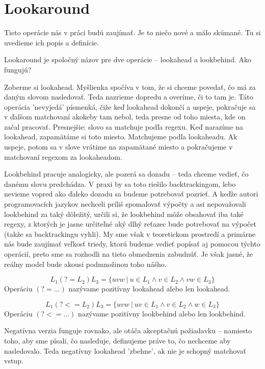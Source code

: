 \section{Lookaround}
\label{dflookaround}

Tieto operácie nás v práci budú zaujímať. Je to niečo nové a málo skúmané. Tu si uvedieme ich popis a definície.

Lookaround je spoločný názov pre dve operácie -- lookahead a lookbehind. Ako fungujú? 

Zoberme si lookahead. Myšlienka spočíva v tom, že si chceme povedať, čo má za daným slovom nasledovať. Teda nazrieme dopredu a overíme, či to tam je. Táto operácia 'nevyjedá' písmenká, čiže keď lookahead dokončí a uspeje, pokračuje sa v ďalšom matchovaní akokeby tam nebol, teda presne od toho miesta, kde on začal pracovať. Presnejšie: slovo sa matchuje podľa regexu. Keď narazíme na lookahead, zapamätáme si toto miesto. Matchujeme podľa lookaheadu. Ak uspeje, potom sa v slove vrátime na zapamätané miesto a pokračujeme v matchovaní regexom za lookaheadom.

Lookbehind pracuje analogicky, ale pozerá sa dozadu -- teda chceme vedieť, čo danému slovu predchádza. V praxi by sa toto riešilo backtrackingom, lebo nevieme vopred ako ďaleko dozadu sa budeme potrebovať pozrieť. A keďže autori programovacích jazykov nechceli príliš spomaľovať výpočty a asi nepovažovali lookbehind za taký dôležitý, určili si, že lookbehind môže obsahovať iba také regexy, z ktorých je jasne určiteľné aký dlhý reťazec bude potrebovať na výpočet (takže sa backtrackingu vyhli). My sme však v teoretickom prostredí a primárne nás bude zaujímať veľkosť triedy, ktorú budeme vedieť popísať aj pomocou týchto operácií, preto sme sa rozhodli na tieto obmedzenia zabudnúť. Je však jasné, že reálny model bude akousi podmnožinou toho nášho.

\begin{df}
$$ L_{1}(?=L_{2})L_{3} = \lbrace uvw ~|~ u \in L_{1} \land v \in L_{2} \land vw \in L_{3} \rbrace $$ Operáciu $(?=\dots)$ nazývame pozitívny lookahead alebo len lookahead.
\end{df}

\begin{df}
$$ L_{1}(?<=L_{2})L_{3} = \lbrace uvw ~|~ uv \in L_{1} \land v \in L_{2} \land w \in L_{3} \rbrace $$ Operáciu $(?<=\dots)$ nazývame pozitívny lookbehind alebo len lookbehind.
\end{df}

Negatívna verzia funguje rovnako, ale otáča akceptačnú požiadavku -- namiesto toho, aby sme písali, čo nasleduje, definujeme práve to, čo nechceme aby nasledovalo. Teda negatívny lookahead 'zbehne', ak nie je schopný matchovať vstup.

